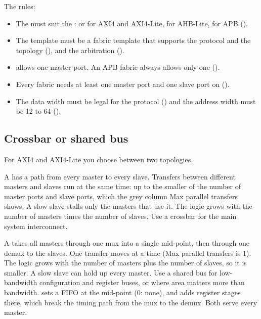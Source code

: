 The rules:

\begin{itemize}
\item The  must suit the :  or
   for AXI4 and AXI4-Lite,  for AHB-Lite,
   for APB ().
\item The template must be a fabric template that supports the protocol and the
  topology (), and the arbitration ().
\item {} allows one master port. An APB fabric always allows only one
  ().
\item Every fabric needs at least one master port and one slave port on
   ().
\item The data width must be legal for the protocol () and the
  address width must be 12 to 64 ().
\end{itemize}

\subsection{Crossbar or shared bus}

For AXI4 and AXI4-Lite you choose between two topologies.

A  has a path from every master to every slave. Transfers between
different masters and slaves run at the same time: up to the smaller of the number of
master ports and slave ports, which the grey column \textsf{Max parallel transfers}
shows. A slow slave stalls only the masters that use it. The logic grows with the number
of masters times the number of slaves. Use a crossbar for the main system interconnect.

A  takes all masters through one mux into a single mid-point, then
through one demux to the slaves. One transfer moves at a time
(\textsf{Max parallel transfers} is 1). The logic grows with the number of masters plus
the number of slaves, so it is smaller. A slow slave can hold up every master. Use a
shared bus for low-bandwidth configuration and register buses, or where area matters
more than bandwidth.  sets a FIFO at the mid-point (0: none),
and  adds register stages there, which break the timing
path from the mux to the demux. Both serve every master.

